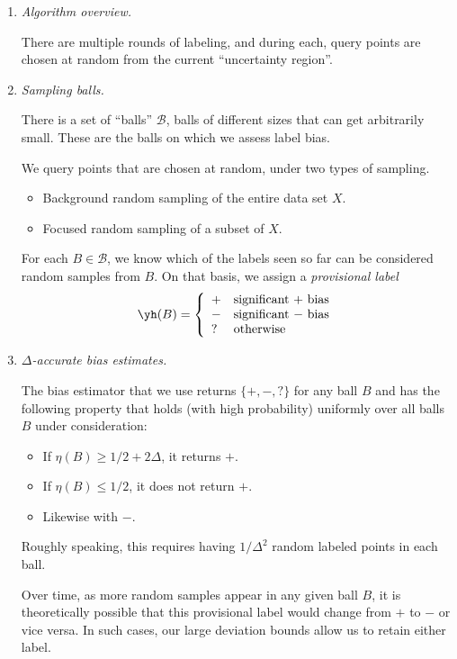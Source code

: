 \documentclass{article}
\def\B{{\mathcal B}}
\begin{document}
\begin{enumerate}

\item {\it Algorithm overview.}

There are multiple rounds of labeling, and during each, query points are chosen at random from the current ``uncertainty region''.

\item {\it Sampling balls.}

There is a set of ``balls'' $\B$, balls of different sizes that can get arbitrarily small. These are the balls on which we assess label bias. 

We query points that are chosen at random, under two types of sampling. 
\begin{itemize}
\item Background random sampling of the entire data set $X$.
\item Focused random sampling of a subset of $X$.
\end{itemize}
For each $B \in \B$, we know which of the labels seen so far can be considered random samples from $B$. On that basis, we assign a {\it provisional label}
$$ \yh(B) = 
\left\{
\begin{array}{ll}
+ & \mbox{significant $+$ bias} \\
- & \mbox{significant $-$ bias} \\
? & \mbox{otherwise}
\end{array}
\right.
$$

\item {\it $\Delta$-accurate bias estimates.}

The bias estimator that we use returns $\{+,-,?\}$ for any ball $B$ and has the following property that holds (with high probability) uniformly over all balls $B$ under consideration:
\begin{itemize}
\item If $\eta(B) \geq 1/2 + 2 \Delta$, it returns $+$.
\item If $\eta(B) \leq 1/2$, it does not return $+$.
\item Likewise with $-$.
\end{itemize}
Roughly speaking, this requires having $1/\Delta^2$ random labeled points in each ball.

Over time, as more random samples appear in any given ball $B$, it is theoretically possible that this provisional label would change from $+$ to $-$ or vice versa. In such cases, our large deviation bounds allow us to retain either label.


\end{enumerate}
\end{document}
